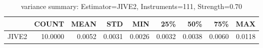 \begin{table}[ht]
\centering
\caption{variance summary: Estimator=JIVE2, Instruments=111, Strength=0.70}
\begin{tabular}{lrrrrrrrr}
\toprule
 & COUNT & MEAN & STD & MIN & 25\% & 50\% & 75\% & MAX \\
\midrule
JIVE2 & 10.0000 & 0.0052 & 0.0031 & 0.0026 & 0.0032 & 0.0038 & 0.0060 & 0.0118 \\
\bottomrule
\end{tabular}
\end{table}
